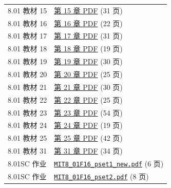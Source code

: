\begin{longtable}{@{}p{}p{}@{}}
8.01 教材 15 & \href{https://ocw.mit.edu/courses/8-01sc-classical-mechanics-fall-2016/mit8_01scs22_chapter15.pdf}{第 15 章 PDF} (31 页) \\
8.01 教材 16 & \href{https://ocw.mit.edu/courses/8-01sc-classical-mechanics-fall-2016/mit8_01scs22_chapter16.pdf}{第 16 章 PDF} (22 页) \\
8.01 教材 17 & \href{https://ocw.mit.edu/courses/8-01sc-classical-mechanics-fall-2016/mit8_01scs22_chapter17.pdf}{第 17 章 PDF} (31 页) \\
8.01 教材 18 & \href{https://ocw.mit.edu/courses/8-01sc-classical-mechanics-fall-2016/mit8_01scs22_chapter18.pdf}{第 18 章 PDF} (19 页) \\
8.01 教材 19 & \href{https://ocw.mit.edu/courses/8-01sc-classical-mechanics-fall-2016/mit8_01scs22_chapter19.pdf}{第 19 章 PDF} (30 页) \\
8.01 教材 20 & \href{https://ocw.mit.edu/courses/8-01sc-classical-mechanics-fall-2016/mit8_01scs22_chapter20.pdf}{第 20 章 PDF} (25 页) \\
8.01 教材 21 & \href{https://ocw.mit.edu/courses/8-01sc-classical-mechanics-fall-2016/mit8_01scs22_chapter21.pdf}{第 21 章 PDF} (30 页) \\
8.01 教材 22 & \href{https://ocw.mit.edu/courses/8-01sc-classical-mechanics-fall-2016/mit8_01scs22_chapter22.pdf}{第 22 章 PDF} (25 页) \\
8.01 教材 23 & \href{https://ocw.mit.edu/courses/8-01sc-classical-mechanics-fall-2016/mit8_01scs22_chapter23.pdf}{第 23 章 PDF} (54 页) \\
8.01 教材 24 & \href{https://ocw.mit.edu/courses/8-01sc-classical-mechanics-fall-2016/mit8_01scs22_chapter24.pdf}{第 24 章 PDF} (19 页) \\
8.01 教材 25 & \href{https://ocw.mit.edu/courses/8-01sc-classical-mechanics-fall-2016/mit8_01scs22_chapter25new.pdf}{第 25 章 PDF} (42 页) \\
8.01 教材 31 & \href{https://ocw.mit.edu/courses/8-01sc-classical-mechanics-fall-2016/mit8_01scs22_chapter31.pdf}{第 31 章 PDF} (34 页) \\
8.01SC 作业 & \href{https://ocw.mit.edu/courses/8-01sc-classical-mechanics-fall-2016/96231b21bccffc0c17c7d98629a52eb2_MIT8_01F16_pset1_new.pdf}{\texttt{MIT8\_01F16\_pset1\_new.pdf}} (6 页) \\
8.01SC 作业 & \href{https://ocw.mit.edu/courses/8-01sc-classical-mechanics-fall-2016/1ebafbf9c9cca8e1ab191ad5ad9026e0_MIT8_01F16_pset2.pdf}{\texttt{MIT8\_01F16\_pset2.pdf}} (8 页) \\

\end{longtable}

